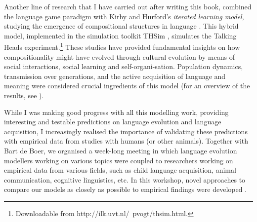 Another line of research that I have carried out after writing this book, combined the language game paradigm with Kirby and Hurford's \citeyear{kirbyhurford:2002} {\em iterated learning model}, studying the emergence of compositional structures in language \citep{vogt:2005a,vogt:2005b}. This hybrid model, implemented in the simulation toolkit THSim \citep{vogt:2003c}, simulates the Talking Heads experiment.\footnote{Downloadable from http://ilk.uvt.nl/~{}pvogt/thsim.html.} These studies have provided fundamental insights on how compositionality might have evolved through cultural evolution by means of social interactions, social learning and self-organi-sation. Population dynamics, transmission over generations, and the active acquisition of language and meaning were considered crucial ingredients of this model (for an overview of the results, see \citeauthor{vogt:2007b}).  

While I was making good progress with all this modelling work, providing interesting and testable predictions on language evolution and language acquisition, I increasingly realised the importance of validating these predictions with empirical data from studies with humans (or other animals). Together with Bart de Boer, we organised a week-long meeting in which language evolution modellers working on various topics were coupled to researchers working on empirical data from various fields, such as child language acquisition, animal communication, cognitive linguistics, etc. In this workshop, novel approaches to compare our models as closely as possible to empirical findings were developed \citep{vogtdeboer:2010}.

